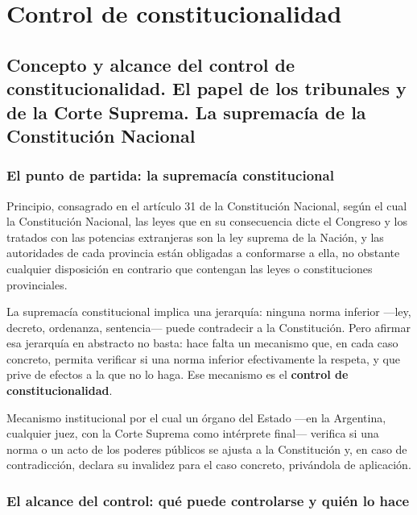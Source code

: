 \documentclass[12pt,oneside]{book}
\begin{document}
\part{Control de constitucionalidad}

\chapter{Concepto y alcance del control de constitucionalidad. El papel de los tribunales y de la Corte Suprema. La supremacía de la Constitución Nacional}
\label{cap:p2}

\section{El punto de partida: la supremacía constitucional}

\begin{defbox}
Principio, consagrado en el artículo 31 de la Constitución Nacional, según el cual
la Constitución Nacional, las leyes que en su consecuencia dicte el Congreso y los
tratados con las potencias extranjeras son la ley suprema de la Nación, y las
autoridades de cada provincia están obligadas a conformarse a ella, no obstante
cualquier disposición en contrario que contengan las leyes o constituciones
provinciales.
\end{defbox}

La supremacía constitucional implica una jerarquía: ninguna norma inferior —ley,
decreto, ordenanza, sentencia— puede contradecir a la Constitución. Pero afirmar
esa jerarquía en abstracto no basta: hace falta un mecanismo que, en cada caso
concreto, permita verificar si una norma inferior efectivamente la respeta, y que
prive de efectos a la que no lo haga. Ese mecanismo es el \textbf{control de
constitucionalidad}.

\begin{defbox}
Mecanismo institucional por el cual un órgano del Estado —en la Argentina,
cualquier juez, con la Corte Suprema como intérprete final— verifica si una norma o
un acto de los poderes públicos se ajusta a la Constitución y, en caso de
contradicción, declara su invalidez para el caso concreto, privándola de
aplicación.
\end{defbox}

\section{El alcance del control: qué puede controlarse y quién lo hace}
\end{document}
